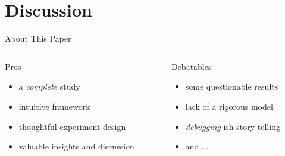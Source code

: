 \section{Discussion}

 \frame{\sectionpage}

\begin{frame}{About This Paper}
    \begin{columns}[T]
        \begin{column}{0.45\textwidth}
            \begin{block}{Pros}
                \begin{itemize}
                    \item a \textit{complete} study
                    \item intuitive framework
                    \item thoughtful experiment design
                    \item valuable insights and discussion
                \end{itemize}
            \end{block}
        \end{column}

        \begin{column}{0.45\textwidth}
            \begin{block}{Debatables}
                \begin{itemize}
                    \item some questionable results
                    \item lack of a rigorous model
                    \item \textit{debugging}-ish story-telling
                    \item and ...
                \end{itemize}
            \end{block}
        \end{column}
    \end{columns}
\end{frame}

